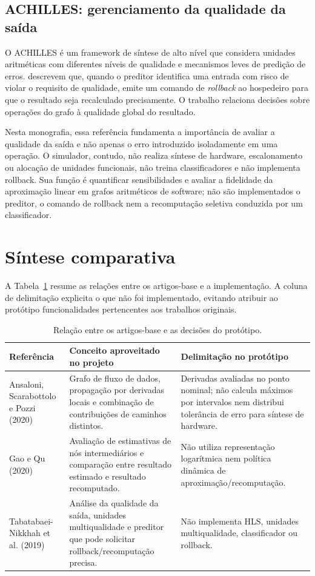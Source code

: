 \documentclass[12pt,openright,oneside,a4paper,brazil]{abntex2}
\begin{document}
\subsection{ACHILLES: gerenciamento da qualidade da saída}
O ACHILLES é um framework de síntese de alto nível que considera unidades aritméticas com diferentes níveis de qualidade e mecanismos leves de predição de erros.  descrevem que, quando o preditor identifica uma entrada com risco de violar o requisito de qualidade, emite um comando de \textit{rollback} ao hospedeiro para que o resultado seja recalculado precisamente. O trabalho relaciona decisões sobre operações do grafo à qualidade global do resultado.

Nesta monografia, essa referência fundamenta a importância de avaliar a qualidade da saída e não apenas o erro introduzido isoladamente em uma operação. O simulador, contudo, não realiza síntese de hardware, escalonamento ou alocação de unidades funcionais, não treina classificadores e não implementa rollback. Sua função é quantificar sensibilidades e avaliar a fidelidade da aproximação linear em grafos aritméticos de software; não são implementados o preditor, o comando de rollback nem a recomputação seletiva conduzida por um classificador.

\section{Síntese comparativa}
A Tabela~\ref{tab:relacao-artigos} resume as relações entre os artigos-base e a implementação. A coluna de delimitação explicita o que não foi implementado, evitando atribuir ao protótipo funcionalidades pertencentes aos trabalhos originais.
\begin{table}[H]
\centering
\small
\caption{Relação entre os artigos-base e as decisões do protótipo.}
\label{tab:relacao-artigos}
\begin{tabularx}{\textwidth}{p{}X X}
\toprule
\textbf{Referência} & \textbf{Conceito aproveitado no projeto} & \textbf{Delimitação no protótipo} \\
\midrule
Ansaloni, Scarabottolo e Pozzi (2020) & Grafo de fluxo de dados, propagação por derivadas locais e combinação de contribuições de caminhos distintos. & Derivadas avaliadas no ponto nominal; não calcula máximos por intervalos nem distribui tolerância de erro para síntese de hardware. \\
Gao e Qu (2020) & Avaliação de estimativas de nós intermediários e comparação entre resultado estimado e resultado recomputado. & Não utiliza representação logarítmica nem política dinâmica de aproximação/recomputação. \\
Tabatabaei-Nikkhah et al. (2019) & Análise da qualidade da saída, unidades multiqualidade e preditor que pode solicitar rollback/recomputação precisa. & Não implementa HLS, unidades multiqualidade, classificador ou rollback. \\
\bottomrule
\end{tabularx}
\end{table}
\end{document}
